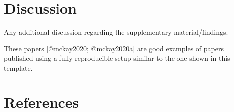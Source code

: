 \documentclass[
  letterpaper,
  DIV=11,
  numbers=noendperiod]{scrartcl}
\begin{document}
\newpage{}

\section{Discussion}\label{discussion}

Any additional discussion regarding the supplementary material/findings.

These papers {[}@mckay2020; @mckay2020a{]} are good examples of papers
published using a fully reproducible setup similar to the one shown in
this template.

\newpage{}

\section{References}\label{references}
\end{document}
